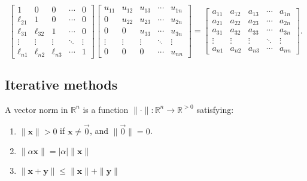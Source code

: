 \documentclass[12pt]{article}
\theoremstyle{definition}
\begin{document}
\begin{equation*}
    \begin{bmatrix}
1      & 0      & 0      & \cdots & 0 \\
\ell_{21} & 1      & 0      & \cdots & 0 \\
\ell_{31} & \ell_{32} & 1      & \cdots & 0 \\
\vdots & \vdots & \vdots & \ddots & \vdots \\
\ell_{n1} & \ell_{n2} & \ell_{n3} & \cdots & 1
\end{bmatrix}
\begin{bmatrix}
u_{11} & u_{12} & u_{13} & \cdots & u_{1n} \\
0      & u_{22} & u_{23} & \cdots & u_{2n} \\
0      & 0      & u_{33} & \cdots & u_{3n} \\
\vdots & \vdots & \vdots & \ddots & \vdots \\
0      & 0      & 0      & \cdots & u_{nn}
\end{bmatrix}
=
\begin{bmatrix}
a_{11} & a_{12} & a_{13} & \cdots & a_{1n} \\
a_{21} & a_{22} & a_{23} & \cdots & a_{2n} \\
a_{31} & a_{32} & a_{33} & \cdots & a_{3n} \\
\vdots & \vdots & \vdots & \ddots & \vdots \\
a_{n1} & a_{n2} & a_{n3} & \cdots & a_{nn}
\end{bmatrix}.
\end{equation*}

















\subsection{Iterative methods}

\begin{definition} 
    A vector norm in $\mathbb{R}^n$ is a function $\| \cdot \| : \mathbb{R}^n
    \to \mathbb{R}^{>0}$ satisfying: 

    \begin{enumerate}
        \item $\|\textbf{x}\| > 0$ if $\textbf{x} \neq \overrightarrow{0}$, and
            $\|\overrightarrow{0}\| = 0$. \item $\|\alpha \textbf{x}\| = |\alpha| \|\textbf{x}\|$
        \item $\|\textbf{x} + \textbf{y}\| \leq \|\textbf{x}\| + \|\textbf{y}\|$
    \end{enumerate}
\end{definition}
\end{document}
